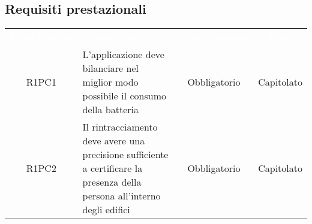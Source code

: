 \subsection{Requisiti prestazionali}
{
\renewcommand{\arraystretch}{1.5}
\centering
\begin{longtable}{ c C{4cm} c c}
\textcolor{white}{\textbf{Identificativo}} & \textcolor{white}{\textbf{Descrizione}} & \textcolor{white}{\textbf{Classificazione}} & \textcolor{white}{\textbf{Fonti}}\\	

R1PC1 & L'applicazione deve bilanciare nel miglior modo possibile il consumo della batteria & Obbligatorio & Capitolato\\

R1PC2 & Il rintracciamento deve avere una precisione sufficiente a certificare la presenza della persona all'interno degli edifici & Obbligatorio & Capitolato\\

\end{longtable}
}